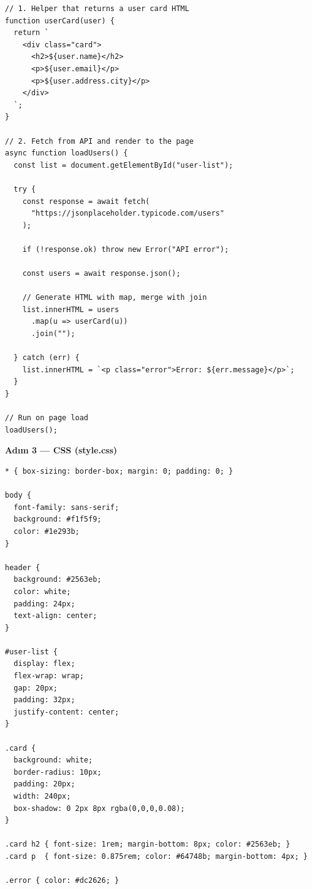 \documentclass[12pt, a4paper]{article}
\begin{document}
\begin{tcolorbox}[enhanced, colback=codebg, colframe=gray!30,
    colbacktitle=primary!85!black, coltitle=white, arc=4pt,
    title={\sffamily\bfseries\small app.js}]
\begin{lstlisting}[style=jsstyle]
// 1. Helper that returns a user card HTML
function userCard(user) {
  return `
    <div class="card">
      <h2>${user.name}</h2>
      <p>${user.email}</p>
      <p>${user.address.city}</p>
    </div>
  `;
}

// 2. Fetch from API and render to the page
async function loadUsers() {
  const list = document.getElementById("user-list");

  try {
    const response = await fetch(
      "https://jsonplaceholder.typicode.com/users"
    );

    if (!response.ok) throw new Error("API error");

    const users = await response.json();

    // Generate HTML with map, merge with join
    list.innerHTML = users
      .map(u => userCard(u))
      .join("");

  } catch (err) {
    list.innerHTML = `<p class="error">Error: ${err.message}</p>`;
  }
}

// Run on page load
loadUsers();
\end{lstlisting}
\end{tcolorbox}

\vspace{8pt}
\textbf{Adım 3 --- CSS (style.css)}

\begin{tcolorbox}[enhanced, colback=codebg, colframe=gray!30,
    colbacktitle=primary!85!black, coltitle=white, arc=4pt,
    title={\sffamily\bfseries\small style.css}]
\begin{lstlisting}[style=jsstyle]
* { box-sizing: border-box; margin: 0; padding: 0; }

body {
  font-family: sans-serif;
  background: #f1f5f9;
  color: #1e293b;
}

header {
  background: #2563eb;
  color: white;
  padding: 24px;
  text-align: center;
}

#user-list {
  display: flex;
  flex-wrap: wrap;
  gap: 20px;
  padding: 32px;
  justify-content: center;
}

.card {
  background: white;
  border-radius: 10px;
  padding: 20px;
  width: 240px;
  box-shadow: 0 2px 8px rgba(0,0,0,0.08);
}

.card h2 { font-size: 1rem; margin-bottom: 8px; color: #2563eb; }
.card p  { font-size: 0.875rem; color: #64748b; margin-bottom: 4px; }

.error { color: #dc2626; }
\end{lstlisting}
\end{tcolorbox}
\end{document}
